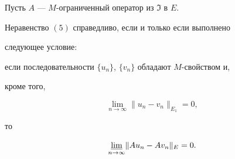 \begin{thm} 


Пусть $A$ --- $M$-ограниченный оператор из $\Im$ в $E$. 


Неравенство $(5)$ справедливо, если и только если выполнено 


следующее условие$:$ 


 


если последовательности $\{u_n\}$, $\{v_n\}$ обладают $M$-свойством и, 


кроме того, 


\begin{equation} 


\lim_{n\to\infty}\|u_n-v_n\|_{E_1}=0, 


\end{equation} 


то 


\begin{equation} 


\down{n\to\infty}{\varliminf} 


\|A u_n-A v_n\|_E=0.


\end{equation} 


\end{thm} 


 


